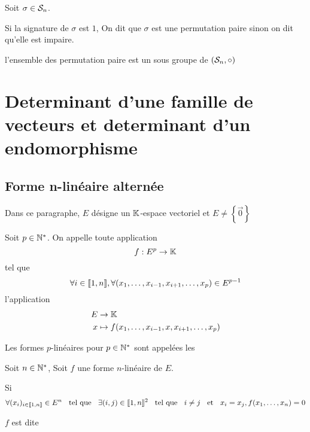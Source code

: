 \begin{dfn}
  Soit $\sigma \in \mathcal{S}_n$.

  Si la signature de $\sigma$ est $1$, On dit que $\sigma$ est une permutation paire sinon on dit
  qu'elle est impaire.

  l'ensemble des permutation paire est un sous groupe de $(\mathcal{S}_n, \circ)$
\end{dfn}

\section{Determinant d'une famille de vecteurs et determinant d'un endomorphisme}

\subsection{Forme n-linéaire alternée}

Dans ce paragraphe, $E$ désigne un $\mathbb{K}$-espace vectoriel et $E \neq \left\{ \vec{0} \right\}$

\begin{dfn}
  Soit $p \in \mathbb{N}^*$. On appelle  toute application
  \[
    f : E^p \to \mathbb{K}
  \]
  tel que
  \[
    \forall i \in \llbracket 1, n \rrbracket, \forall (x_1, \ldots, x_{i - 1}, x_{i + 1}, \ldots, x_p) \in E^{p - 1}
  \]
  l'application
  \begin{align*}
    E &\to \mathbb{K} \\
    x &\mapsto f(x_1, \ldots, x_{i - 1}, x, x_{i + 1}, \ldots, x_p)
  \end{align*}

  Les formes $p$-linéaires pour $p \in \mathbb{N}^*$ sont appelées les 
\end{dfn}

\begin{dfn}
  Soit $n \in \mathbb{N}^*$, Soit $f$ une forme $n$-linéaire de $E$.

  Si
  \[
      \forall (x_i)_{i \in \llbracket 1, n \rrbracket} \in E^n \;\;\text{ tel que }\;\; 
    \exists (i, j) \in \llbracket 1, n \rrbracket^2 \;\;\text{ tel que }\;\; i \neq j \;\;\text{ et }\;\; x_i = x_j,
    f(x_1, \ldots, x_n) = 0 
  \]
  
  $f$ est dite 
\end{dfn}



